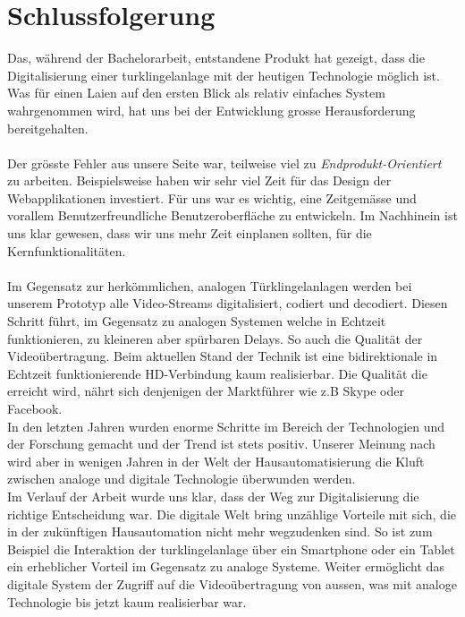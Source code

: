 \newpage

\section{Schlussfolgerung}
\label{sec:schlussfolgerung}
Das, während der Bachelorarbeit, entstandene Produkt hat gezeigt, dass die Digitalisierung einer \gls{turklingelanlage} mit der heutigen Technologie möglich ist. Was für einen Laien auf den ersten Blick als relativ einfaches System wahrgenommen wird, hat uns bei der Entwicklung grosse Herausforderung bereitgehalten. 
\\
\\
Der grösste Fehler aus unsere Seite war, teilweise viel zu \textit{Endprodukt-Orientiert} zu arbeiten. Beispielsweise haben wir sehr viel Zeit für das Design der Webapplikationen investiert. Für uns war es wichtig, eine Zeitgemässe und vorallem Benutzerfreundliche Benutzeroberfläche zu entwickeln. Im Nachhinein ist uns klar gewesen, dass wir uns mehr Zeit einplanen sollten, für die Kernfunktionalitäten. 
\\
\\
Im Gegensatz zur herkömmlichen, analogen Türklingelanlagen werden bei unserem Prototyp alle Video-Streams digitalisiert, codiert und decodiert. Diesen Schritt führt, im Gegensatz zu analogen Systemen welche in Echtzeit funktionieren, zu kleineren aber spürbaren Delays. So auch die Qualität der Videoübertragung. Beim aktuellen Stand der Technik ist eine bidirektionale in Echtzeit funktionierende HD-Verbindung kaum realisierbar. Die Qualität die erreicht wird, nährt sich denjenigen der Marktführer wie z.B Skype oder Facebook.
\\
In den letzten Jahren wurden enorme Schritte im Bereich der Technologien und der Forschung gemacht und der Trend ist stets positiv. Unserer Meinung nach wird aber in wenigen Jahren in der Welt der Hausautomatisierung die Kluft zwischen analoge und digitale Technologie überwunden werden.
\\
Im Verlauf der Arbeit wurde uns klar, dass der Weg zur Digitalisierung die richtige Entscheidung war. Die digitale Welt bring unzählige Vorteile mit sich, die in der zukünftigen Hausautomation nicht mehr wegzudenken sind. So ist zum Beispiel die Interaktion der \gls{turklingelanlage} über ein Smartphone oder ein Tablet ein erheblicher Vorteil im Gegensatz zu analoge Systeme. Weiter ermöglicht das digitale System der Zugriff auf die Videoübertragung von aussen, was mit analoge Technologie bis jetzt kaum realisierbar war.
\\
   

    



  
